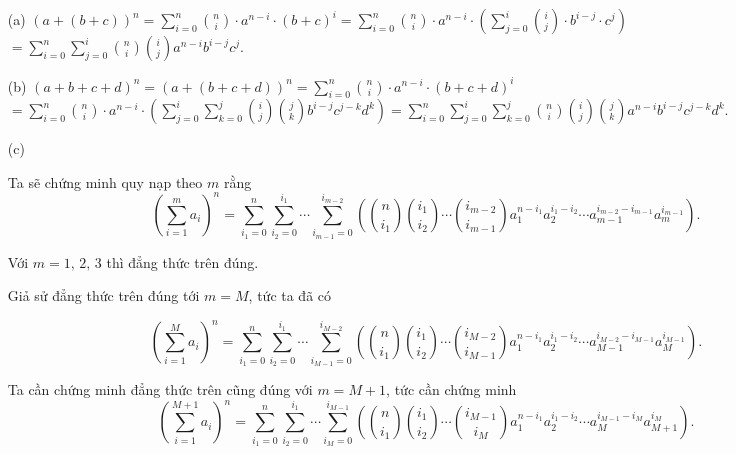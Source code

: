 \begin{enumerate}
    \item[(a)] {$\displaystyle \left(a+(b+c)\right)^n = \sum\limits_{i = 0}^n {n \choose i} \cdot a^{n-i} \cdot (b+c)^i = \sum\limits_{i = 0}^n {n \choose i} \cdot a^{n-i} \cdot \left(\sum\limits_{j = 0}^{i} {i \choose j} \cdot b^{i-j} \cdot c^j\right)$ \\ $\displaystyle = \sum\limits_{i = 0}^n \sum\limits_{j = 0}^{i} {n \choose i} {i \choose j} a^{n-i} b^{i-j} c^j$.}
    \item[(b)] {$\displaystyle (a + b + c + d)^n = \left(a+(b+c+d)\right)^n = \sum\limits_{i = 0}^n {n \choose i} \cdot a^{n-i} \cdot (b+c+d)^i$ \\ $\displaystyle = \sum\limits_{i = 0}^n {n \choose i} \cdot a^{n-i} \cdot \left(\sum\limits_{j = 0}^i \sum\limits_{k = 0}^{j} {i \choose j} {j \choose k} b^{i-j} c^{j-k} d^k\right) = \sum\limits_{i = 0}^n \sum\limits_{j = 0}^i \sum\limits_{k = 0}^j {n \choose i} {i \choose j} {j \choose k} a^{n-i} b^{i-j} c^{j-k} d^k$.} 
    \item[(c)] {Ta sẽ chứng minh quy nạp theo $m$ rằng $$\displaystyle\left(\sum\limits_{i=1}^m a_i\right)^n = \sum\limits_{i_1 = 0}^n \sum\limits_{i_2 = 0}^{i_1} \cdots \sum\limits_{i_{m-1} = 0}^{i_{m-2}} \left({n \choose i_1} {i_1 \choose i_2} \cdots {i_{m-2} \choose i_{m-1}} a_1^{n-i_1} a_2^{i_1-i_2} \cdots a_{m-1}^{i_{m-2}-i_{m-1}}a_m^{i_{m-1}}\right).$$
    
    Với $m = 1,\,2,\,3$ thì đẳng thức trên đúng.
    
    Giả sử đẳng thức trên đúng tới $m = M$, tức ta đã có 
    
    $$\displaystyle\left(\sum\limits_{i=1}^M a_i\right)^n = \sum\limits_{i_1 = 0}^n \sum\limits_{i_2 = 0}^{i_1} \cdots \sum\limits_{i_{M-1} = 0}^{i_{M-2}} \left({n \choose i_1} {i_1 \choose i_2} \cdots {i_{M-2} \choose i_{M-1}} a_1^{n-i_1} a_2^{i_1-i_2} \cdots a_{M-1}^{i_{M-2}-i_{M-1}}a_M^{i_{M-1}}\right).$$

    Ta cần chứng minh đẳng thức trên cũng đúng với $m = M+1$, tức cần chứng minh 
    $$\displaystyle\left(\sum\limits_{i=1}^{M+1} a_i\right)^n = \sum\limits_{i_1 = 0}^n \sum\limits_{i_2 = 0}^{i_1} \cdots \sum\limits_{i_{M} = 0}^{i_{M-1}} \left({n \choose i_1} {i_1 \choose i_2} \cdots {i_{M-1} \choose i_{M}} a_1^{n-i_1} a_2^{i_1-i_2} \cdots a_{M}^{i_{M-1}-i_{M}}a_{M+1}^{i_{M}}\right).$$

}
\end{enumerate}
